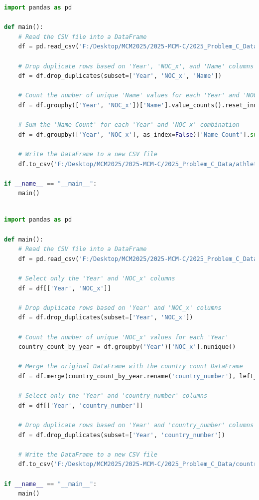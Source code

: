 \documentclass[12pt]{article}
\begin{document}
\begin{lstlisting}[language=Python, style=mystyle, caption=calculate\_athelte\_number.py]
import pandas as pd

def main():
    # Read the CSV file into a DataFrame
    df = pd.read_csv('F:/Desktop/MCM2025/2025-MCM-C/2025_Problem_C_Data/summerOly_athletes_v3.0.csv')

    # Drop duplicate rows based on 'Year', 'NOC_x', and 'Name' columns
    df = df.drop_duplicates(subset=['Year', 'NOC_x', 'Name'])

    # Count the number of unique 'Name' values for each 'Year' and 'NOC_x' combination
    df = df.groupby(['Year', 'NOC_x'])['Name'].value_counts().reset_index(name='Name_Count')

    # Sum the 'Name_Count' for each 'Year' and 'NOC_x' combination
    df = df.groupby(['Year', 'NOC_x'], as_index=False)['Name_Count'].sum()

    # Write the DataFrame to a new CSV file
    df.to_csv('F:/Desktop/MCM2025/2025-MCM-C/2025_Problem_C_Data/athlete_number.csv', index=False, encoding='utf-8')

if __name__ == "__main__":
    main()
    
\end{lstlisting}

\begin{lstlisting}[language=Python, style=mystyle, caption=calculate\_country\_number.py]
import pandas as pd

def main():
    # Read the CSV file into a DataFrame
    df = pd.read_csv('F:/Desktop/MCM2025/2025-MCM-C/2025_Problem_C_Data/summerOly_athletes_v3.0.csv')

    # Select only the 'Year' and 'NOC_x' columns
    df = df[['Year', 'NOC_x']]

    # Drop duplicate rows based on 'Year' and 'NOC_x' columns
    df = df.drop_duplicates(subset=['Year', 'NOC_x'])

    # Count the number of unique 'NOC_x' values for each 'Year'
    country_count_by_year = df.groupby('Year')['NOC_x'].nunique()

    # Merge the original DataFrame with the country count DataFrame
    df = df.merge(country_count_by_year.rename('country_number'), left_on='Year', right_index=True)

    # Select only the 'Year' and 'country_number' columns
    df = df[['Year', 'country_number']]

    # Drop duplicate rows based on 'Year' and 'country_number' columns
    df = df.drop_duplicates(subset=['Year', 'country_number'])

    # Write the DataFrame to a new CSV file
    df.to_csv('F:/Desktop/MCM2025/2025-MCM-C/2025_Problem_C_Data/country_number.csv', index=False, encoding='utf-8')

if __name__ == "__main__":
    main()
\end{lstlisting}
\end{document}
